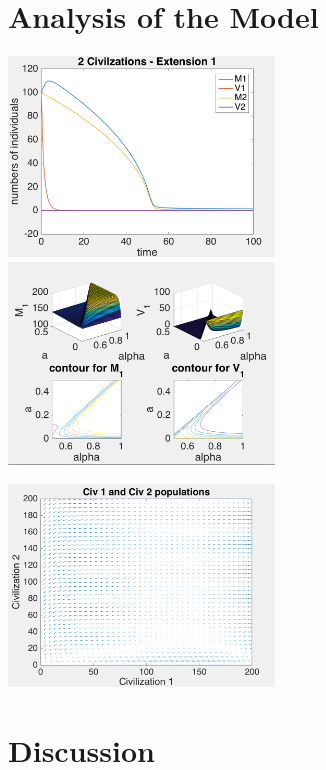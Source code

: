 \documentclass[12pt]{article}
\begin{document}
\section{Analysis of the Model}
\paragraph{}


\includegraphics[width=200pt]{examplesim1}
\includegraphics[width=200pt]{examplecontour1}

\includegraphics[width=200pt]{phase2}

\section{Discussion}
\paragraph{}
\end{document}
